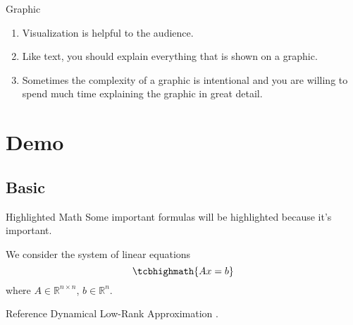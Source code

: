 \documentclass[compress,aspectratio=43]{beamer}
\begin{document}
\begin{frame}{Graphic}
    \begin{enumerate}
        \item Visualization is helpful to the audience.

              \medskip
        \item Like text, you should explain everything that is shown on a graphic.

              \medskip
        \item Sometimes the complexity of a graphic is intentional and you are willing to spend much time explaining the graphic in great detail.
    \end{enumerate}

\end{frame}

\section{Demo}

\subsection{Basic}

\begin{frame}{Highlighted Math}
    Some important formulas will be \alert{highlighted} because it's important.

    \medskip
    We consider the system of linear equations
    \begin{equation}\label{eq:LE}
        \tcbhighmath{Ax = b}
    \end{equation}
    where $A\in\mathbb{R}^{n \times n}$, $b\in\mathbb{R}^n$.
\end{frame}

\begin{frame}{Reference}
    Dynamical Low-Rank Approximation .
\end{frame}
\end{document}
